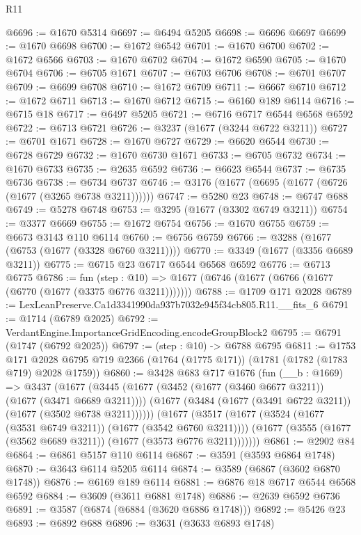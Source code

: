 \begin{lexlean}{R11}
\begin{coremodule}
@6696 := @1670 @5314
@6697 := @6494 @5205
@6698 := @6696 @6697
@6699 := @1670 @6698
@6700 := @1672 @6542
@6701 := @1670 @6700
@6702 := @1672 @6566
@6703 := @1670 @6702
@6704 := @1672 @6590
@6705 := @1670 @6704
@6706 := @6705 @1671
@6707 := @6703 @6706
@6708 := @6701 @6707
@6709 := @6699 @6708
@6710 := @1672 @6709
@6711 := @6667 @6710
@6712 := @1672 @6711
@6713 := @1670 @6712
@6715 := @6160 @189 @6114
@6716 := @6715 @18
@6717 := @6497 @5205
@6721 := @6716 @6717 @6544 @6568 @6592
@6722 := @6713 @6721
@6726 := @3237 (@1677 (@3244 @6722 @3211))
@6727 := @6701 @1671
@6728 := @1670 @6727
@6729 := @6620 @6544
@6730 := @6728 @6729
@6732 := @1670 @6730 @1671
@6733 := @6705 @6732
@6734 := @1670 @6733
@6735 := @2635 @6592
@6736 := @6623 @6544
@6737 := @6735 @6736
@6738 := @6734 @6737
@6746 := @3176 (@1677 (@6695 (@1677 (@6726 (@1677 (@3265 @6738 @3211))))))
@6747 := @5280 @23
@6748 := @6747 @688
@6749 := @5278 @6748
@6753 := @3295 (@1677 (@3302 @6749 @3211))
@6754 := @3377 @6669
@6755 := @1672 @6754
@6756 := @1670 @6755
@6759 := @6673 @3143 @110 @6114
@6760 := @6756 @6759
@6766 := @3288 (@1677 (@6753 (@1677 (@3328 @6760 @3211))))
@6770 := @3349 (@1677 (@3356 @6689 @3211))
@6775 := @6715 @23 @6717 @6544 @6568 @6592
@6776 := @6713 @6775
@6786 := fun (step : @10) =>
  @1677 (@6746 (@1677 (@6766 (@1677 (@6770 (@1677 (@3375 @6776 @3211)))))))
@6788 := @1709 @171 @2028
@6789 := LexLeanPreserve.Ca1d3341990da937b7032e945f34cb805.R11.__fits_6
@6791 := @1714 (@6789 @2025)
@6792 := VerdantEngine.ImportanceGridEncoding.encodeGroupBlock2
@6795 := @6791 (@1747 (@6792 @2025))
@6797 := (step : @10) -> @6788 @6795
@6811 := @1753
    @171
    @2028
    @6795
    @719
    @2366
    (@1764 (@1775 @171))
    (@1781 (@1782 (@1783 @719) @2028 @1759))
@6860 := @3428
    @683
    @717
    @1676
    (fun (__b : @1669) =>
    @3437
      (@1677
        (@3445
          (@1677 (@3452 (@1677 (@3460 @6677 @3211)) (@1677 (@3471 @6689 @3211))))
          (@1677 (@3484 (@1677 (@3491 @6722 @3211)) (@1677 (@3502 @6738 @3211))))))
      (@1677
        (@3517
          (@1677 (@3524 (@1677 (@3531 @6749 @3211)) (@1677 (@3542 @6760 @3211))))
          (@1677 (@3555 (@1677 (@3562 @6689 @3211)) (@1677 (@3573 @6776 @3211)))))))
@6861 := @2902 @84
@6864 := @6861 @5157 @110 @6114
@6867 := @3591 (@3593 @6864 @1748)
@6870 := @3643 @6114 @5205 @6114
@6874 := @3589 (@6867 (@3602 @6870 @1748))
@6876 := @6169 @189 @6114
@6881 := @6876 @18 @6717 @6544 @6568 @6592
@6884 := @3609 (@3611 @6881 @1748)
@6886 := @2639 @6592 @6736
@6891 := @3587 (@6874 (@6884 (@3620 @6886 @1748)))
@6892 := @5426 @23
@6893 := @6892 @688
@6896 := @3631 (@3633 @6893 @1748)

\end{coremodule}
\end{lexlean}
